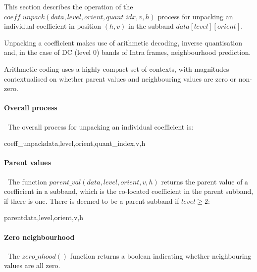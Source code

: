 \label{wltcoeff}

This section describes the operation of the 
$coeff\_unpack(data,level,orient,quant\_idx,v,h)$ process
for unpacking an individual coefficient in position $(h,v)$ 
in the subband $data[level][orient]$.

Unpacking a coefficient makes use of arithmetic decoding, inverse quantisation
and, in the case of DC (level 0) bands of Intra frames, neighbourhood prediction.

Arithmetic coding uses a highly compact set of contexts, 
with magnitudes contextualised on whether parent values
and neighbouring values are zero or non-zero.

\paragraph{Overall process}
$\ $\newline
The overall process for unpacking an individual coefficient is:

\begin{pseudo}{coeff\_unpack}{data,level,orient,quant\_index,v,h}
\end{pseudo}

\paragraph{Parent values}
\label{parentval}
$\ $\newline
The function $parent\_val(data,level,orient,v, h)$ returns the parent value of a coefficient in a subband,
which is the co-located coefficient in the parent subband, if there is one. There is deemed to be a 
parent subband if $level\geq 2$:

\begin{pseudo}{parent}{data,level,orient,v,h}
\bsELSE
\bsEND
{}
\end{pseudo}

\paragraph{Zero neighbourhood}
\label{zeronhood}
$\ $\newline
The $zero\_nhood()$ function returns a boolean indicating whether neighbouring
values are all zero.

